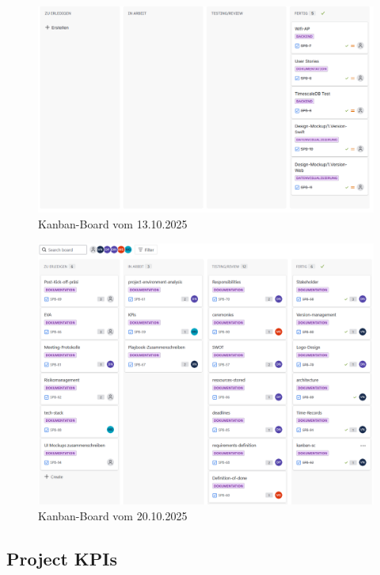 \documentclass{article}
\begin{document}
\begin{figure}[H]
  \centering
  \includegraphics[width=\textwidth]{Kanban_Board_2_Sprint.png}
  \caption{Kanban-Board vom 13.10.2025}
  \label{fig:kanban-board-2-sprint}
\end{figure}

\begin{figure}[H]
  \centering
  \includegraphics[width=\textwidth]{Kanban_Board_3_Sprint.png}
  \caption{Kanban-Board vom 20.10.2025}
  \label{fig:kanban-board-3-sprint}
\end{figure}


\pagebreak

\subsection{Project KPIs}
\end{document}
